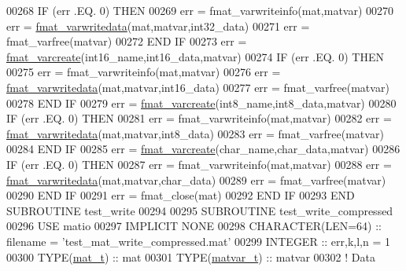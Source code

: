 \begin{DoxyCode}
{00268             \textcolor{keywordflow}{IF} (err .EQ. 0) \textcolor{keywordflow}{THEN}
00269                 err = fmat\_varwriteinfo(mat,matvar)
00270                 err = \hyperlink{interfacematio_1_1fmat__varwritedata}{fmat\_varwritedata}(mat,matvar,int32\_data)
00271                 err = fmat\_varfree(matvar)
00272 \textcolor{keywordflow}{            END IF}
00273             err = \hyperlink{interfacematio_1_1fmat__varcreate}{fmat\_varcreate}(int16\_name,int16\_data,matvar)
00274             \textcolor{keywordflow}{IF} (err .EQ. 0) \textcolor{keywordflow}{THEN}
00275                 err = fmat\_varwriteinfo(mat,matvar)
00276                 err = \hyperlink{interfacematio_1_1fmat__varwritedata}{fmat\_varwritedata}(mat,matvar,int16\_data)
00277                 err = fmat\_varfree(matvar)
00278 \textcolor{keywordflow}{            END IF}
00279             err = \hyperlink{interfacematio_1_1fmat__varcreate}{fmat\_varcreate}(int8\_name,int8\_data,matvar)
00280             \textcolor{keywordflow}{IF} (err .EQ. 0) \textcolor{keywordflow}{THEN}
00281                 err = fmat\_varwriteinfo(mat,matvar)
00282                 err = \hyperlink{interfacematio_1_1fmat__varwritedata}{fmat\_varwritedata}(mat,matvar,int8\_data)
00283                 err = fmat\_varfree(matvar)
00284 \textcolor{keywordflow}{            END IF}
00285             err = \hyperlink{interfacematio_1_1fmat__varcreate}{fmat\_varcreate}(char\_name,char\_data,matvar)
00286             \textcolor{keywordflow}{IF} (err .EQ. 0) \textcolor{keywordflow}{THEN}
00287                 err = fmat\_varwriteinfo(mat,matvar)
00288                 err = \hyperlink{interfacematio_1_1fmat__varwritedata}{fmat\_varwritedata}(mat,matvar,char\_data)
00289                 err = fmat\_varfree(matvar)
00290 \textcolor{keywordflow}{            END IF}
00291             err = fmat\_close(mat)
00292 \textcolor{keywordflow}{        END IF}
00293 \textcolor{keyword}{    END SUBROUTINE }test\_write
00294 
00295 \textcolor{keyword}{    SUBROUTINE }test\_write\_compressed
00296     \textcolor{keywordtype}{USE }matio
00297     \textcolor{keywordtype}{IMPLICIT NONE}
00298         \textcolor{keywordtype}{CHARACTER(LEN=64)}  :: filename = \textcolor{stringliteral}{'test\_mat\_write\_compressed.mat'}
00299         \textcolor{keywordtype}{INTEGER}            :: err,k,l,n = 1
00300         \textcolor{keywordtype}{TYPE}(\hyperlink{group___m_a_t_gab0fc888f5a5d79943b16284b1f91c2e8}{mat\_t})        :: mat
00301         \textcolor{keywordtype}{TYPE}(\hyperlink{group___m_a_t_structmatvar__t}{matvar\_t})     :: matvar
00302         \textcolor{comment}{! Data}
}
\end{DoxyCode}

